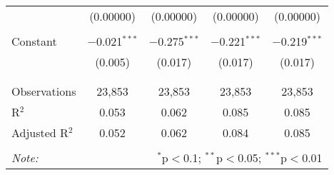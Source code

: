\begin{table}[!htbp]
\begin{tabular}{@{\extracolsep{-5pt}}lcccc}
  & (0.00000) & (0.00000) & (0.00000) & (0.00000) \\ 
  & & & & \\ 
 Constant & $-$0.021$^{***}$ & $-$0.275$^{***}$ & $-$0.221$^{***}$ & $-$0.219$^{***}$ \\ 
  & (0.005) & (0.017) & (0.017) & (0.017) \\ 
  & & & & \\ 
\hline \\[-1.8ex] 
Observations & 23,853 & 23,853 & 23,853 & 23,853 \\ 
R$^{2}$ & 0.053 & 0.062 & 0.085 & 0.085 \\ 
Adjusted R$^{2}$ & 0.052 & 0.062 & 0.084 & 0.085 \\ 
\hline 
\hline \\[-1.8ex] 
\textit{Note:}  & \multicolumn{4}{r}{$^{*}$p$<$0.1; $^{**}$p$<$0.05; $^{***}$p$<$0.01} \\ 
\end{tabular} 
\end{table} 
